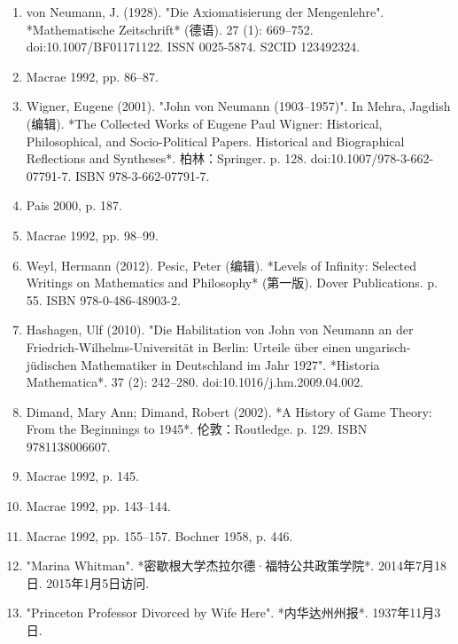 \begin{enumerate}
\item von Neumann, J. (1928). "Die Axiomatisierung der Mengenlehre". *Mathematische Zeitschrift* (德语). 27 (1): 669–752. doi:10.1007/BF01171122. ISSN 0025-5874. S2CID 123492324.  
\item Macrae 1992, pp. 86–87.  
\item Wigner, Eugene (2001). "John von Neumann (1903–1957)". In Mehra, Jagdish (编辑). *The Collected Works of Eugene Paul Wigner: Historical, Philosophical, and Socio-Political Papers. Historical and Biographical Reflections and Syntheses*. 柏林：Springer. p. 128. doi:10.1007/978-3-662-07791-7. ISBN 978-3-662-07791-7.  
\item Pais 2000, p. 187.  
\item Macrae 1992, pp. 98–99.  
\item Weyl, Hermann (2012). Pesic, Peter (编辑). *Levels of Infinity: Selected Writings on Mathematics and Philosophy* (第一版). Dover Publications. p. 55. ISBN 978-0-486-48903-2.  
\item Hashagen, Ulf (2010). "Die Habilitation von John von Neumann an der Friedrich-Wilhelms-Universität in Berlin: Urteile über einen ungarisch-jüdischen Mathematiker in Deutschland im Jahr 1927". *Historia Mathematica*. 37 (2): 242–280. doi:10.1016/j.hm.2009.04.002.  
\item Dimand, Mary Ann; Dimand, Robert (2002). *A History of Game Theory: From the Beginnings to 1945*. 伦敦：Routledge. p. 129. ISBN 9781138006607.  
\item Macrae 1992, p. 145.  
\item Macrae 1992, pp. 143–144.  
\item Macrae 1992, pp. 155–157.  
Bochner 1958, p. 446.  
\item "Marina Whitman". *密歇根大学杰拉尔德·福特公共政策学院*. 2014年7月18日. 2015年1月5日访问.  
\item "Princeton Professor Divorced by Wife Here". *内华达州州报*. 1937年11月3日.  
\end{enumerate}
